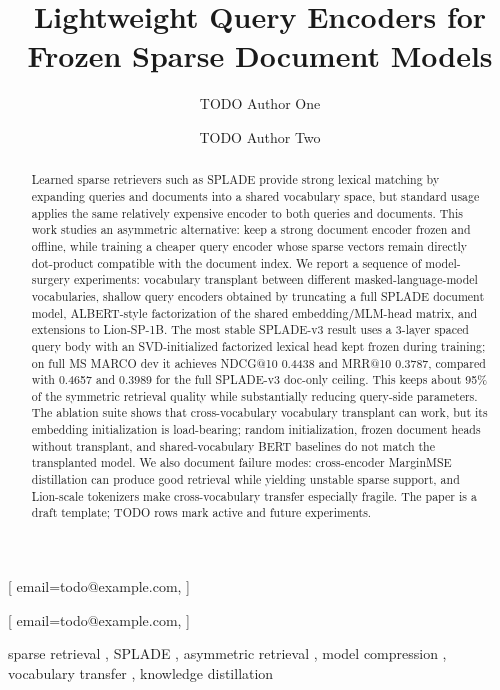 \documentclass[
]{ceurart}
\begin{document}


\title{Lightweight Query Encoders for Frozen Sparse Document Models}

\author[1]{TODO Author One}[%
email=todo@example.com,
]
\author[1]{TODO Author Two}[%
email=todo@example.com,
]
\address[1]{TODO Affiliation}

\begin{abstract}
Learned sparse retrievers such as SPLADE provide strong lexical matching by
expanding queries and documents into a shared vocabulary space, but standard
usage applies the same relatively expensive encoder to both queries and
documents. This work studies an asymmetric alternative: keep a strong document
encoder frozen and offline, while training a cheaper query encoder whose sparse
vectors remain directly dot-product compatible with the document index. We
report a sequence of model-surgery experiments: vocabulary transplant between
different masked-language-model vocabularies, shallow query encoders obtained by
truncating a full SPLADE document model, ALBERT-style factorization of the
shared embedding/MLM-head matrix, and extensions to Lion-SP-1B. The most stable
SPLADE-v3 result uses a 3-layer spaced query body with an SVD-initialized
factorized lexical head kept frozen during training; on full MS MARCO dev it
achieves NDCG@10 0.4438 and MRR@10 0.3787, compared with 0.4657 and 0.3989 for
the full SPLADE-v3 doc-only ceiling. This keeps about 95\% of the symmetric
retrieval quality while substantially reducing query-side parameters. The
ablation suite shows that cross-vocabulary vocabulary transplant can work, but
its embedding initialization is load-bearing; random initialization, frozen
document heads without transplant, and shared-vocabulary BERT baselines do not
match the transplanted model. We also document failure modes: cross-encoder
MarginMSE distillation can produce good retrieval while yielding unstable sparse
support, and Lion-scale tokenizers make cross-vocabulary transfer especially
fragile. The paper is a draft template; TODO rows mark active and future
experiments.
\end{abstract}

\begin{keywords}
  sparse retrieval \sep
  SPLADE \sep
  asymmetric retrieval \sep
  model compression \sep
  vocabulary transfer \sep
  knowledge distillation
\end{keywords}
\end{document}
